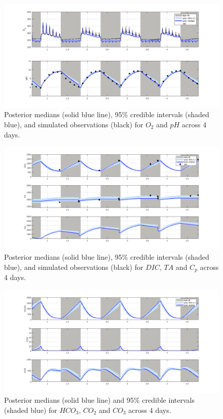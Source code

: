 \documentclass{ruthesis}
\begin{document}
\begin{figure}
	\centerline{\includegraphics[width=1.2\textwidth]{images_microalgae/plots_test/O2_pH}}
	\caption[.]{Posterior medians (solid blue line), 95\% credible intervals (shaded blue), and simulated observations (black) for $O_2$ and $pH$ across 4 days.}
	\label{fig:micro_exp_test_O2_pH}
\end{figure}

\begin{figure}
	\centerline{\includegraphics[width=1.2\textwidth]{images_microalgae/plots_test/DIC_TA_Cp}}
	\caption[.]{Posterior medians (solid blue line), 95\% credible intervals (shaded blue), and simulated observations (black) for $DIC$, $TA$ and $C_p$ across 4 days.}
	\label{fig:micro_exp_test_DIC_TA_Cp}
\end{figure}

\begin{figure}
	\centerline{\includegraphics[width=1.2\textwidth]{images_microalgae/plots_test/carbon}}
	\caption[.]{Posterior medians (solid blue line) and 95\% credible intervals (shaded blue) for $HCO_3$, $CO_2$ and $CO_3$ across 4 days.}
	\label{fig:micro_exp_test_carbon}
\end{figure}
\end{document}
